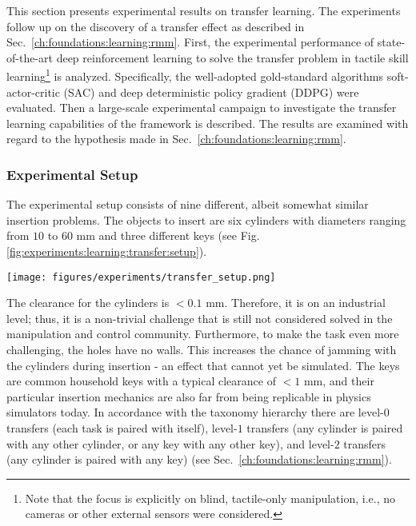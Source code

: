 This section presents experimental results on transfer learning.
The experiments follow up on the discovery of a transfer effect as described in Sec.~\ref{ch:foundations:learning:rmm}.
First, the experimental performance of state-of-the-art deep reinforcement learning to solve the transfer problem in tactile skill learning\footnote{Note that the focus is explicitly on blind, tactile-only manipulation, i.e., no cameras or other external sensors were considered.} is analyzed.
Specifically, the well-adopted gold-standard algorithms soft-actor-critic (SAC) \cite{haarnoja2018soft} and deep deterministic policy gradient (DDPG) \cite{Lillicrap.2015} were evaluated.
Then a large-scale experimental campaign to investigate the transfer learning capabilities of the \softwareabbr{} framework is described.
The results are examined with regard to the hypothesis made in Sec.~\ref{ch:foundations:learning:rmm}.

\subsubsection{Experimental Setup}
The experimental setup consists of nine different, albeit somewhat similar insertion problems.
The objects to insert are six cylinders with diameters ranging from $10$ to $60$ mm and three different keys (see Fig. \ref{fig:experiments:learning:transfer:setup}).
\begin{figure*}[ht!]
    \centering
    \texttt{[image: figures/experiments/transfer\_setup.png]}
    \caption{The analyzed reference tasks consist of six cylinders with increasing diameters and three different common household keys (bottom left). Five robots were used in total for the experiment.}
    \label{fig:experiments:learning:transfer:setup}
\end{figure*}
The clearance for the cylinders is $< 0.1$ mm.
Therefore, it is on an industrial level; thus, it is a non-trivial challenge that is still not considered solved in the manipulation and control community.
Furthermore, to make the task even more challenging, the holes have no walls.
This increases the chance of jamming with the cylinders during insertion - an effect that cannot yet be simulated.
The keys are common household keys with a typical clearance of $<1$ mm, and their particular insertion mechanics are also far from being replicable in physics simulators today.
In accordance with the taxonomy hierarchy there are level-$0$ transfers (each task is paired with itself), level-$1$ transfers (any cylinder is paired with any other cylinder, or any key with any other key), and level-$2$ transfers (any cylinder is paired with any key) (see Sec.~\ref{ch:foundations:learning:rmm}).

